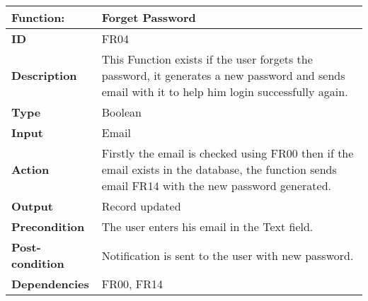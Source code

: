 \documentclass[]{article}
\begin{document}
\FloatBarrier
\begin{table}[h]
\caption{ }
\label{tab:my-table}
\begin{tabular}{|p{}|p{}|}
\hline
\textbf{Function:} & Forget Password
\\ \hline
\textbf{ID}  &            FR04

\\ \hline
\textbf{Description}    &       This Function exists if the user forgets the password, it generates a new password and sends email with it to help him login successfully again.                                                               
\\ \hline
\textbf{Type}    &       Boolean  

\\ \hline
\textbf{Input}        & Email


\\ \hline
\textbf{Action}            & Firstly the email is checked using FR00 then if the email exists in the database, the function sends email FR14 with the new password generated.

\\ \hline
\textbf{Output}            & Record updated

\\ \hline
\textbf{Precondition}           &   The user enters his email in the Text field.

\\ \hline
\textbf{Post-condition}     & Notification is sent to the user with new password.


\\ \hline
\textbf{Dependencies}           & FR00, FR14
\\ \hline
\end{tabular}
\end{table}
\end{document}

